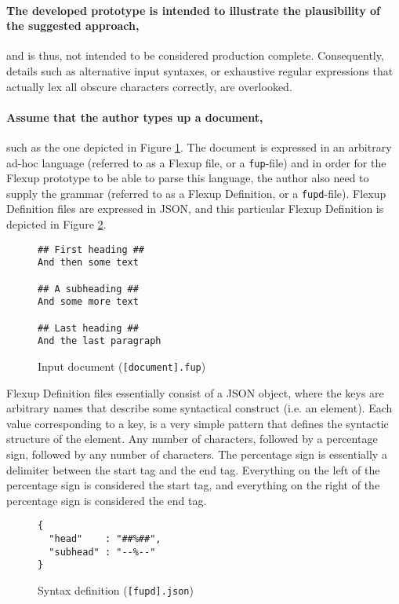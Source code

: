 \documentclass{scrreprt}
\begin{document}
\paragraph{The developed prototype is intended to illustrate the plausibility of the suggested approach, } and is thus, not intended to be considered production complete. Consequently, details such as alternative input syntaxes, or exhaustive regular expressions that actually lex all obscure characters correctly, are overlooked.


\paragraph{Assume that the author types up a document,} such as the one depicted in Figure \ref{ex:numbered-headings-input}. The document is expressed in an arbitrary ad-hoc language (referred to as a Flexup file, or a \texttt{fup}-file) and in order for the Flexup prototype to be able to parse this language, the author also need to supply the grammar (referred to as a Flexup Definition, or a \texttt{fupd}-file). Flexup Definition files are expressed in JSON, and this particular Flexup Definition is depicted in Figure \ref{ex:numbered-headings-fupd}.

\begin{figure}[h]
\begin{lstlisting}
## First heading ##
And then some text

## A subheading ##
And some more text

## Last heading ##
And the last paragraph
\end{lstlisting}
\caption{Input document (\texttt{[document].fup})}
\label{ex:numbered-headings-input}
\end{figure}

Flexup Definition files essentially consist of a JSON object, where the keys are arbitrary names that describe some syntactical construct (i.e. an element). Each value corresponding to a key, is a very simple pattern that defines the syntactic structure of the element. Any number of characters, followed by a percentage sign, followed by any number of characters. The percentage sign is essentially a delimiter between the start tag and the end tag. Everything on the left of the percentage sign is considered the start tag, and everything on the right of the percentage sign is considered the end tag.

\begin{figure}[h]
\begin{lstlisting}
{
  "head"    : "##%##",
  "subhead" : "--%--"
}
\end{lstlisting}
\caption{Syntax definition (\texttt{[fupd].json})}
\label{ex:numbered-headings-fupd}
\end{figure}
\end{document}
